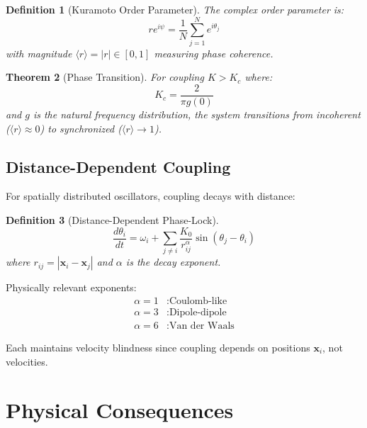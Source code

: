 \documentclass[twocolumn,amsmath,amssymb,aps,prl,superscriptaddress]{revtex4-2}
\newtheorem{theorem}{Theorem}[section]
\newtheorem{definition}[theorem]{Definition}
\newcommand{\orderp}{\langle r \rangle}
\begin{document}
\begin{definition}[Kuramoto Order Parameter]
The complex order parameter is:
\begin{equation}
r e^{i\psi} = \frac{1}{N} \sum_{j=1}^{N} e^{i\theta_j}
\end{equation}
with magnitude $\orderp = |r| \in [0, 1]$ measuring phase coherence.
\end{definition}

\begin{theorem}[Phase Transition]
\label{thm:transition}
For coupling $K > K_c$ where:
\begin{equation}
K_c = \frac{2}{\pi g(0)}
\end{equation}
and $g$ is the natural frequency distribution, the system transitions from incoherent ($\orderp \approx 0$) to synchronized ($\orderp \to 1$).
\end{theorem}

\subsection{Distance-Dependent Coupling}

For spatially distributed oscillators, coupling decays with distance:

\begin{definition}[Distance-Dependent Phase-Lock]
\begin{equation}
\frac{d\theta_i}{dt} = \omega_i + \sum_{j \neq i} \frac{K_0}{r_{ij}^{\alpha}} \sin(\theta_j - \theta_i)
\end{equation}
where $r_{ij} = |\mathbf{x}_i - \mathbf{x}_j|$ and $\alpha$ is the decay exponent.
\end{definition}

Physically relevant exponents:
\begin{align}
\alpha = 1 &: \text{Coulomb-like} \\
\alpha = 3 &: \text{Dipole-dipole} \\
\alpha = 6 &: \text{Van der Waals}
\end{align}

Each maintains velocity blindness since coupling depends on positions $\mathbf{x}_i$, not velocities.

\section{Physical Consequences}
\label{sec:consequences}
\end{document}
